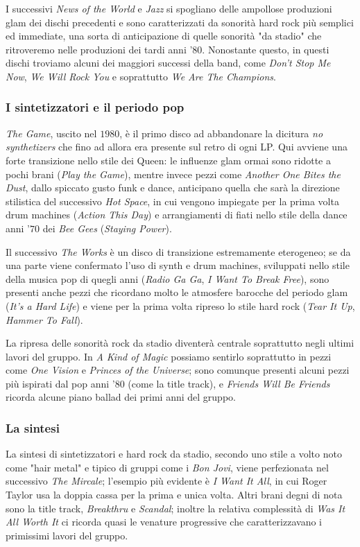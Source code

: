 \documentclass[12pt]{article}
\begin{document}
I successivi \emph{News of the World} e \emph{Jazz} si spogliano delle ampollose produzioni glam dei dischi precedenti e sono caratterizzati da sonorità hard rock più semplici ed immediate, una sorta di anticipazione di quelle sonorità "da stadio" che ritroveremo nelle produzioni dei tardi anni '\(80\). Nonostante questo, in questi dischi troviamo alcuni dei maggiori successi della band, come \emph{Don't Stop Me Now}, \emph{We Will Rock You} e soprattutto \emph{We Are The Champions}.

\subsubsection{I sintetizzatori e il periodo pop}

\emph{The Game}, uscito nel \(1980\), è il primo disco ad abbandonare la dicitura \emph{no synthetizers} che fino ad allora era presente sul retro di ogni LP. Qui avviene una forte transizione nello stile dei Queen: le influenze glam ormai sono ridotte a pochi brani (\emph{Play the Game}), mentre invece pezzi come \emph{Another One Bites the Dust}, dallo spiccato gusto funk e dance, anticipano quella che sarà la direzione stilistica del successivo \emph{Hot Space}, in cui vengono impiegate per la prima volta drum machines (\emph{Action This Day}) e arrangiamenti di fiati nello stile della dance anni '\(70\) dei \emph{Bee Gees} (\emph{Staying Power}).

Il successivo \emph{The Works} è un disco di transizione estremamente eterogeneo; se da una parte viene confermato l'uso di synth e drum machines, sviluppati nello stile della musica pop di quegli anni (\emph{Radio Ga Ga}, \emph{I Want To Break Free}), sono presenti anche pezzi che ricordano molto le atmosfere barocche del periodo glam (\emph{It's a Hard Life}) e viene per la prima volta ripreso lo stile hard rock (\emph{Tear It Up}, \emph{Hammer To Fall}).

La ripresa delle sonorità rock da stadio diventerà centrale soprattutto negli ultimi lavori del gruppo. In \emph{A Kind of Magic} possiamo sentirlo soprattutto in pezzi come \emph{One Vision} e \emph{Princes of the Universe}; sono comunque presenti alcuni pezzi più ispirati dal pop anni '\(80\) (come la title track), e \emph{Friends Will Be Friends} ricorda alcune piano ballad dei primi anni del gruppo.

\subsubsection{La sintesi}\label{subsubsec:synth}
La sintesi di sintetizzatori e hard rock da stadio, secondo uno stile a volto noto come "hair metal" e tipico di gruppi come i \emph{Bon Jovi}, viene perfezionata nel successivo \emph{The Mircale}; l'esempio più evidente è \emph{I Want It All}, in cui Roger Taylor usa la doppia cassa per la prima e unica volta. Altri brani degni di nota sono la title track, \emph{Breakthru} e \emph{Scandal}; inoltre la relativa complessità di \emph{Was It All Worth It} ci ricorda quasi le venature progressive che caratterizzavano i primissimi lavori del gruppo.
\end{document}
